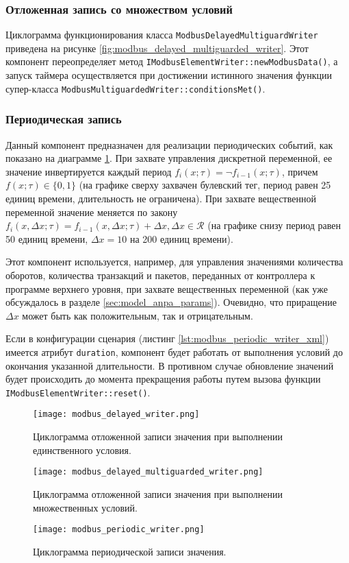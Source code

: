 \subsubsection{Отложенная запись со множеством условий}
Циклограмма функционирования класса \texttt{ModbusDelayedMultiguardWriter} приведена на рисунке \ref{fig:modbus_delayed_multiguarded_writer}.
Этот компонент переопределяет метод \texttt{IModbusElementWriter::newModbusData()},
а запуск таймера осуществляется при достижении истинного значения
функции супер-класса \texttt{ModbusMultiguardedWriter::conditionsMet()}.

\subsubsection{Периодическая запись}
Данный компонент предназначен для реализации периодических событий, как показано на диаграмме \ref{fig:modbus_periodic_writer}.
При захвате управления дискретной переменной, ее значение инвертируется каждый период
$f_i(x; \tau) = \lnot f_{i-1}(x; \tau)$, причем $f(x; \tau) \in \{0, 1\}$
(на графике сверху захвачен булевский тег, период равен 25 единиц времени, длительность не ограничена).
При захвате вещественной переменной значение меняется по закону
$f_i(x,\Delta x; \tau) = f_{i-1}(x,\Delta x; \tau) + \Delta x, \Delta x \in \mathcal{R}$
(на графике снизу период равен 50 единиц времени, $\Delta x = 10$ на 200 единиц времени).

Этот компонент используется, например, для управления значениями количества оборотов,
количества транзакций и пакетов, переданных от контроллера к программе верхнего уровня,
при захвате вещественных переменной (как уже обсуждалось в разделе \ref{sec:model_anpa_params}).
Очевидно, что приращение $\Delta x$ может быть как положительным, так и отрицательным.

Если в конфигурации сценария (листинг \ref{lst:modbus_periodic_writer_xml}) имеется атрибут
\texttt{duration}, компонент будет работать от выполнения условий до окончания указанной длительности.
В противном случае обновление значений будет происходить до момента прекращения работы
путем вызова функции \texttt{IModbusElementWriter::reset()}.

\begin{figure}[h!]\begin{center}
    \texttt{[image: modbus\_delayed\_writer.png]}
    \caption{Циклограмма отложенной записи значения при выполнении единственного условия.}\label{fig:modbus_delayed_writer}
    \texttt{[image: modbus\_delayed\_multiguarded\_writer.png]}
    \caption{Циклограмма отложенной записи значения при выполнении множественных условий.}\label{fig:modbus_delayed_multiguarded_writer}
    \texttt{[image: modbus\_periodic\_writer.png]}
    \caption{Циклограмма периодической записи значения.}\label{fig:modbus_periodic_writer}
\end{center}\end{figure}



